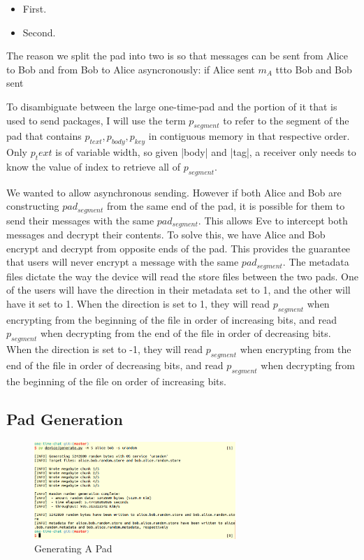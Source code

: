 \documentclass[twocolumn]{article}
\begin{document}
\begin{itemize}
  \item[] First.
  \item[] Second.
\end{itemize}

The reason we split the pad into two is so that messages can be sent from Alice to Bob and from Bob to Alice asyncronously: if Alice sent $m_A$ ttto Bob and Bob sent

To disambiguate between the large one-time-pad and the portion of it that is used to send packages, I will use the term $p_{segment}$ to refer to the segment of the pad that contains $p_{text}, p_{body}, p_{key}$ in contiguous memory in that respective order.  Only ${p_text}$ is of variable width, so given |body| and |tag|, a receiver only needs to know the value of index to retrieve all of $p_{segment}$.


 We wanted to allow asynchronous sending. However if both Alice and Bob are constructing $pad_{segment}$ from the same end of the pad, it is possible for them to send their messages with the same $pad_{segment}$. This allows Eve to intercept both messages and decrypt their contents. To solve this, we have Alice and Bob encrypt and decrypt from opposite ends of the pad. This provides the guarantee that users will never encrypt a message with the same $pad_{segment}$. The metadata files dictate the way the device will read the store files between the two pads. One of the users will have the direction in their metadata set to 1, and the other will have it set to 1. When the direction is set to 1, they will read $p_{segment}$ when encrypting from the beginning of the file in order of increasing bits, and read $p_{segment}$ when decrypting from the end of the file in order of decreasing bits. When the direction is set to -1, they will read $p_{segment}$ when encrypting from the end of the file in order of decreasing bits, and read $p_{segment}$ when decrypting from the beginning of the file on order of increasing bits.


\subsection{Pad Generation}
\label{sec:padgen}
\begin{figure}[htp]
\centering
\includegraphics[width=3in]{generate}
\caption{Generating A Pad}
\end{figure}
\end{document}
